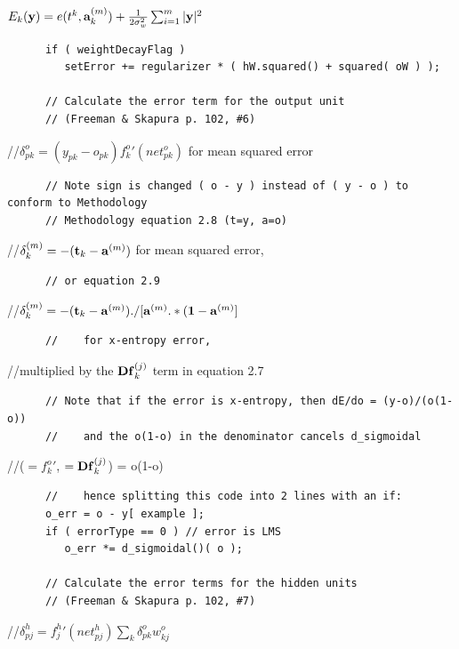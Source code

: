 \documentclass{report}[10pt]
\begin{document}
$E_k({\bf y}) = e(t^k, {\bf a}^{(m)}_k) + \frac{1}{2\sigma_w^2} \sum_{i=1}^m |{\bf y}|^2$
\begin{verbatim}
      if ( weightDecayFlag )
         setError += regularizer * ( hW.squared() + squared( oW ) );

      // Calculate the error term for the output unit
      // (Freeman & Skapura p. 102, #6)
\end{verbatim}
\hspace{24 pt}//\hspace{4 pt}$\delta^o_{pk} = (y_{pk} - o_{pk}){f^o_k}'(net^o_{pk})$ for mean squared error
\begin{verbatim}
      // Note sign is changed ( o - y ) instead of ( y - o ) to conform to Methodology
      // Methodology equation 2.8 (t=y, a=o)
\end{verbatim}
\hspace{24 pt}//\hspace{4 pt}$\delta^{(m)}_k = -({\bf t}_k - {\bf a}^{(m)})$ for mean squared error,
\begin{verbatim}
      // or equation 2.9
\end{verbatim}
\hspace{24 pt}//\hspace{4 pt}$\delta^{(m)}_k = -({\bf t}_k - {\bf a}^{(m)}) ./ [{\bf a}^{(m)} .* ({\bf 1} - {\bf a}^{(m)}]$
\begin{verbatim}
      //    for x-entropy error,
\end{verbatim}
\hspace{24 pt}//\hspace{4 pt}multiplied by the ${\bf Df}^{(j)}_k$ term in equation 2.7
\begin{verbatim}
      // Note that if the error is x-entropy, then dE/do = (y-o)/(o(1-o))
      //    and the o(1-o) in the denominator cancels d_sigmoidal
\end{verbatim}
\hspace{24 pt}//\hspace{12 pt}($={f^o_k}'$, $={\bf Df}^{(j)}_k$) = o(1-o)
\begin{verbatim}
      //    hence splitting this code into 2 lines with an if:
      o_err = o - y[ example ];
      if ( errorType == 0 ) // error is LMS
         o_err *= d_sigmoidal()( o );
      
      // Calculate the error terms for the hidden units
      // (Freeman & Skapura p. 102, #7)
\end{verbatim}
\hspace{24 pt}//\hspace{4 pt}$\delta^h_{pj} = {f^h_j}'(net^h_{pj}) \sum_k \delta^o_{pk} w^o_{kj}$
\end{document}
